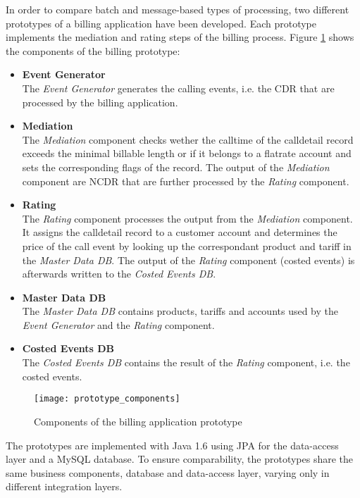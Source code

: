 In order to compare batch and message-based types of processing, two different prototypes of a billing application have been developed. Each prototype implements the mediation and rating steps of the billing process. Figure \ref{fig:ch4_prototype_components} shows the components of the billing prototype: 
\begin{itemize}
	\item \textbf{Event Generator}\\
	The \emph{Event Generator} generates the calling events, i.e. the \ac{CDR} that are processed by the billing application.
	\item \textbf{Mediation}\\
	The \emph{Mediation} component checks wether the calltime of the calldetail record exceeds the minimal billable length or if it belongs to a flatrate account and sets the corresponding flags of the record. The output of the \emph{Mediation} component are \ac{NCDR} that are further processed by the \emph{Rating} component.
	\item \textbf{Rating}\\
	The \emph{Rating} component processes the output from the \emph{Mediation} component. It assigns the calldetail record to a customer account and determines the price of the call event by looking up the correspondant product and tariff in the \emph{Master Data DB}. The output of the \emph{Rating} component (costed events) is afterwards written to the \emph{Costed Events DB}.
	\item \textbf{Master Data DB}\\
	The \emph{Master Data DB} contains products, tariffs and accounts used by the \emph{Event Generator} and the \emph{Rating} component.
	\item \textbf{Costed Events DB}\\
	The \emph{Costed Events DB} contains the result of the \emph{Rating} component, i.e. the costed events.
\end{itemize}

\begin{figure}[h!]
	\centering
	\texttt{[image: prototype\_components]}
	\caption{Components of the billing application prototype}
	\label{fig:ch4_prototype_components}
\end{figure}

The prototypes are implemented with Java 1.6 using \ac{JPA} for the data-access layer and a MySQL database. To ensure comparability, the prototypes share the same business components, database and data-access layer, varying only in different integration layers. 

